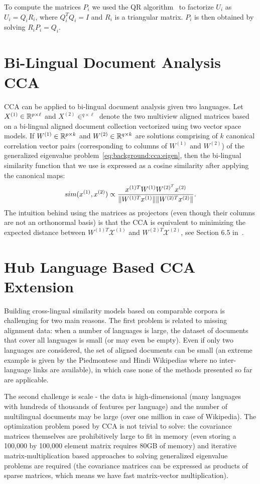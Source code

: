 To compute the matrices $P_i$ we used the QR algorithm~\cite{golub} to factorize
$U_i$ as $U_i = Q_i R_i$, where $Q_i^TQ_i = I$ and $R_i$ is a triangular matrix.
$P_i$ is then obtained by solving $R_i P_i = Q_i$.

\section{Bi-Lingual Document Analysis CCA}\label{chap:crosslingual:CCA}
CCA can be applied to bi-lingual document analysis given two languages. Let $X^{(1)} \in \mathbb{R}^{p \times \ell}$ 
and $X^{(2)} \in ^{q \times \ell}$ denote the two multiview aligned matrices based on a bi-lingual aligned 
document collection vectorized using two vector space models. 
If $W^{(1)}\in \mathbb{R}^{p\times k}$ and $W^{(2)} \in \mathbb{R}^{q\times k}$ are solutions comprising of $k$ canonical 
correlation vector pairs (corresponding to columns of $W^{(1)}$ and $W^{(2)}$)
of the generalized eigenvalue problem~\ref{eq:background:cca:eigen}, then
the bi-lingual similarity function that we use is expressed as a cosine similarity
after applying the canonical maps:
$$sim(x^{(1)}, x^{(2)}) \propto \frac{x^{(1)T} W^{(1)}W^{(2)^T}x^{(2)}}{\lVert W^{(1)T}x^{(1)}\rVert \lVert W^{(2)T}x^{(2)}\rVert} .$$
The intuition behind using the matrices as projectors (even though their columns are not an 
orthonormal basis) is that the CCA is equivalent to minimizing the expected
distance between $W^{(1)T}\mathcal{X}^{(1)}$ and $W^{(2)T}\mathcal{X}^{(2)}$, 
see Section 6.5 in~\cite{shawe-taylor04kernel}. 


\section{Hub Language Based CCA Extension}\label{chap:crosslingual:hublang}
Building cross-lingual similarity models based on comparable corpora is challenging for
two main reasons. The first problem is related to missing alignment data: when a number
of languages is large, the dataset of documents that cover all languages is small (or may
even be empty). Even if only two languages are considered, the set of aligned documents
can be small (an extreme example is given by the Piedmontese and Hindi Wikipedias where
no inter-language links are available), in which case none of the methods presented so
far are applicable.

The second challenge is scale - the data is high-dimensional (many languages with
hundreds of thousands of features per language) and the number of multilingual documents may 
be large (over one million in case of Wikipedia). The optimization problem posed by CCA is not trivial 
to solve: the covariance matrices themselves are prohibitively
large to fit in memory (even storing a 100,000 by 100,000 element matrix requires 
80GB of memory) and iterative matrix-multiplication based approaches to solving generalized 
eigenvalue problems are required (the covariance matrices can be expressed as products 
of sparse matrices, which means we have fast matrix-vector multiplication).

